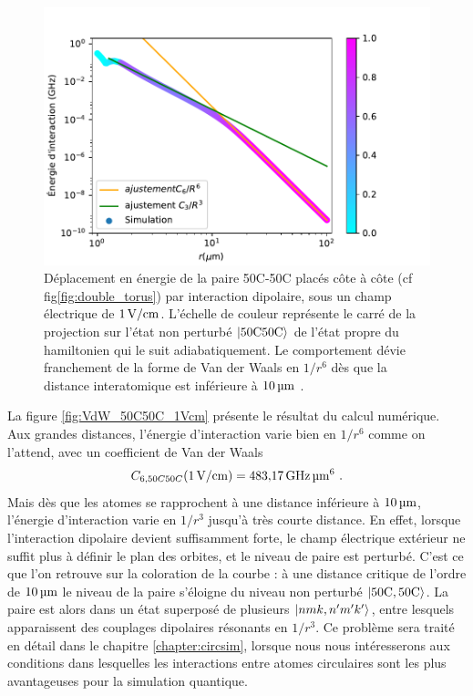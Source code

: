 \begin{figure}[!h]
\centering
\includegraphics[width=1\linewidth]{figures/theory/VdW_50C50C_1Vcm}
\caption[Interaction dipolaire 50C-50C]{Déplacement en énergie de la paire 50C-50C placés côte à côte (cf fig\eqref{fig:double_torus}) par interaction dipolaire, sous un champ électrique de $\SIvv{1}{\V / \cm}$. L'échelle de couleur représente le carré de la projection sur l'état non perturbé $\ket{50\text{C} 50\text{C}}$ de l'état propre du hamiltonien qui le suit adiabatiquement.
Le comportement dévie franchement de la forme de Van der Waals en $1/r^6$ dès que la distance interatomique est inférieure à $\SIv{10}{\micro\meter}$.
}
\label{fig:VdW_50C50C_1Vcm}
\end{figure}

La figure \eqref{fig:VdW_50C50C_1Vcm} présente le résultat du calcul numérique.
Aux grandes distances, l'énergie d'interaction varie bien en $1/r^6$ comme on l'attend, avec un coefficient de Van der Waals 
\begin{equation}
\label{eq:C6_50C50C}
C_{6,50C50C}(\SIvv{1}{V/cm}) = \SIv{483.17}{\GHz\raiseto{6}\um}.
\end{equation}
Mais dès que les atomes se rapprochent à une distance inférieure à $\SIvv{10}{\um}$, l'énergie d'interaction varie en $1/r^3$ jusqu'à très courte distance.
En effet, lorsque l'interaction dipolaire devient suffisamment forte, le champ électrique extérieur ne suffit plus à définir le plan des orbites, et le niveau de paire est perturbé.
C'est ce que l'on retrouve sur la coloration de la courbe : à une distance critique de l'ordre de $\SIvv{10}{\um}$ le niveau de la paire s'éloigne du niveau non perturbé $\ket{\mathrm{50C,50C}}$.
La paire est alors dans un état superposé de plusieurs $\ket{nmk,n'm'k'}$, entre lesquels apparaissent des couplages dipolaires résonants en $1/r^3$.
Ce problème sera traité en détail dans le chapitre \ref{chapter:circsim}, lorsque nous nous intéresserons aux conditions dans lesquelles les interactions entre atomes circulaires sont les plus avantageuses pour la simulation quantique.

